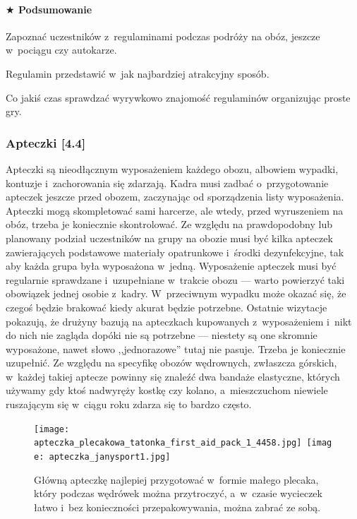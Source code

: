 \documentclass[a5paper,10pt,titlepage,twoside]{article}
\newcommand*{\thecheckbox}{\hss$\Box$} %
\newenvironment*{checklist}
{\list{}{%
\renewcommand*{\makelabel}[1]{\thecheckbox}}}
{\endlist}
\begin{document}
\paragraph{$\bigstar$ Podsumowanie}
\begin{checklist}
\item Zapoznać uczestników z~regulaminami podczas podróży na obóz, jeszcze w~pociągu czy autokarze.
\item Regulamin przedstawić w~jak najbardziej atrakcyjny sposób.
\item Co jakiś czas sprawdzać wyrywkowo znajomość regulaminów organizując proste gry.
\end{checklist}
\subsubsection{Apteczki [4.4]}
Apteczki są nieodłącznym wyposażeniem każdego obozu, albowiem wypadki, kontuzje i~zachorowania się zdarzają. Kadra musi zadbać o~przygotowanie apteczek jeszcze przed obozem, zaczynając od sporządzenia listy wyposażenia. Apteczki mogą skompletować sami harcerze, ale wtedy, przed wyruszeniem na obóz, trzeba je koniecznie skontrolować. Ze względu na prawdopodobny lub planowany podział uczestników na grupy na obozie musi być kilka apteczek zawierających podstawowe materiały opatrunkowe i~środki dezynfekcyjne, tak aby każda grupa była wyposażona w~jedną. Wyposażenie apteczek musi być regularnie sprawdzane i~uzupełniane w~trakcie obozu --- warto powierzyć taki obowiązek jednej osobie z~kadry. W~przeciwnym wypadku może okazać się, że czegoś będzie brakować kiedy akurat będzie potrzebne. Ostatnie wizytacje pokazują, że drużyny bazują na apteczkach kupowanych z~wyposażeniem i~nikt do nich nie zagląda dopóki nie są potrzebne --- niestety są one skromnie wyposażone, nawet słowo ,,jednorazowe'' tutaj nie pasuje. Trzeba je koniecznie uzupełnić. Ze względu na specyfikę obozów wędrownych, zwłaszcza górskich, w~każdej takiej aptecze powinny się znaleźć dwa bandaże elastyczne, których używamy gdy ktoś nadwyręży kostkę czy kolano, a~mieszczuchom niewiele ruszającym się w~ciągu roku zdarza się to bardzo często.
\begin{figure}[htp]
\centering
\texttt{[image: apteczka\_plecakowa\_tatonka\_first\_aid\_pack\_1\_4458.jpg]}~\texttt{[image: apteczka\_janysport1.jpg]}
\caption{Główną apteczkę najlepiej przygotować w~formie małego plecaka, który podczas wędrówek można przytroczyć, a~w~czasie wycieczek łatwo i~bez konieczności przepakowywania, można zabrać ze sobą.}\label{fig:apteczka-plecak}
\end{figure}
\end{document}

